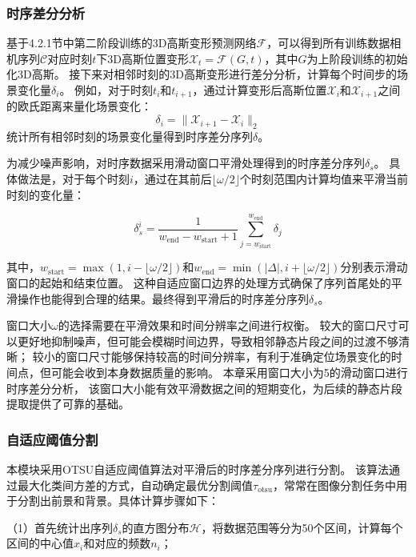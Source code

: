 \subsubsection{时序差分分析}
基于4.2.1节中第二阶段训练的3D高斯变形预测网络$\mathcal{F}$，可以得到所有训练数据相机序列$\mathcal{C}$对应时刻$t$下3D高斯位置变形$\mathcal{X}_t=\mathcal{F}(G, t)$，其中$G$为上阶段训练的初始化3D高斯。
接下来对相邻时刻的3D高斯变形进行差分分析，计算每个时间步的场景变化量$\delta_i$。
例如，对于时刻$t_i$和$t_{i+1}$，通过计算变形后高斯位置$\mathcal{X}_i$和$\mathcal{X}_{i+1}$之间的欧氏距离来量化场景变化：
\begin{equation}
\delta_i = \|\mathcal{X}_{i+1} - \mathcal{X}_i\|_2
\end{equation}
统计所有相邻时刻的场景变化量得到时序差分序列$\delta$。

为减少噪声影响，对时序数据采用滑动窗口平滑处理得到的时序差分序列$\delta_s$。
具体做法是，对于每个时刻$i$，通过在其前后$\lfloor\omega/2\rfloor$个时刻范围内计算均值来平滑当前时刻的变化量：

\begin{equation}
\delta_s^i = \frac{1}{w_{\text{end}} - w_{\text{start}} + 1} \sum_{j=w_{\text{start}}}^{w_{\text{end}}} \delta_j
\end{equation}

其中，$w_{\text{start}} = \max(1, i - \lfloor\omega/2\rfloor)$和$w_{\text{end}} = \min(|\Delta|, i + \lfloor\omega/2\rfloor)$分别表示滑动窗口的起始和结束位置。
这种自适应窗口边界的处理方式确保了序列首尾处的平滑操作也能得到合理的结果。最终得到平滑后的时序差分序列$\delta_s$。

窗口大小$\omega$的选择需要在平滑效果和时间分辨率之间进行权衡。
较大的窗口尺寸可以更好地抑制噪声，但可能会模糊时间边界，导致相邻静态片段之间的过渡不够清晰；
较小的窗口尺寸能够保持较高的时间分辨率，有利于准确定位场景变化的时间点，但可能会收到本身数据质量的影响。
本章采用窗口大小为5的滑动窗口进行时序差分分析，
该窗口大小能有效平滑数据之间的短期变化，为后续的静态片段提取提供了可靠的基础。

\subsubsection{自适应阈值分割}
本模块采用OTSU自适应阈值算法对平滑后的时序差分序列进行分割。
该算法通过最大化类间方差的方式，自动确定最优分割阈值$\tau_{\text{otsu}}$，常常在图像分割任务中用于分割出前景和背景。具体计算步骤如下：

（1）首先统计出序列$\delta_s$的直方图分布$\mathcal{H}$，将数据范围等分为50个区间，计算每个区间的中心值$x_i$和对应的频数$n_i$；

